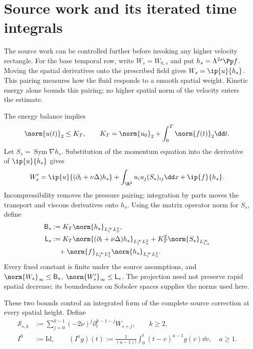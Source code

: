 \section{Source work and its iterated time integrals}
\label{r:sec:source-primitives}

The source work can be controlled further before invoking any higher
velocity rectangle. For the base temporal row, write \(W_s=W_{0,s}\)
and put \(h_s=\Lambda^{2s}\Pp f\). Moving the spatial derivatives onto
the prescribed field gives \(W_s=\ip{u}{h_s}\). This pairing measures
how the fluid responds to a smooth spatial weight. Kinetic energy alone bounds this pairing; no higher spatial norm
of the velocity enters the estimate.

The energy balance implies
\[
 \norm{u(t)}_2\le K_T,
 \qquad K_T=\norm{u_0}_2+\int_0^T\norm{f(t)}_2\dd t.
\]
Let \(S_s=\operatorname{Sym}\nabla h_s\). Substitution of the
momentum equation into the derivative of \(\ip{u}{h_s}\) gives
\begin{equation}
 W_s'=\ip{u}{(\partial_t+\nu\Delta)h_s}
 +\int_{\R^3}u_i u_j(S_s)_{ij}\dd x+\ip{f}{h_s}.
 \label{r:eq:source-first}
\end{equation}
Incompressibility removes the pressure pairing; integration by parts
moves the transport and viscous derivatives onto \(h_s\).
Using the matrix operator norm for \(S_s\), define
\begin{equation}
 \begin{aligned}
 \mathsf B_s&:=K_T\norm{h_s}_{L^\infty_tL^2_x},\\
 \mathsf L_s&:=K_T\norm{(\partial_t+\nu\Delta)h_s}_{L^\infty_tL^2_x}
 +K_T^2\norm{S_s}_{L^\infty_{t,x}}\\
 &\quad+\norm{f}_{L^\infty_tL^2_x}\norm{h_s}_{L^\infty_tL^2_x}.
 \end{aligned}
 \label{r:eq:source-work-constants}
\end{equation}
Every fixed constant is finite under the source assumptions, and
\(\norm{W_s}_\infty\le\mathsf B_s\),
\(\norm{W_s'}_\infty\le\mathsf L_s\). The projection need not preserve
rapid spatial decrease; its boundedness on Sobolev spaces supplies the
norms used here.

These two bounds control an integrated form of the complete source
correction at every spatial height. Define
\begin{equation}
 \begin{aligned}
 \mathcal S_{s,k}&:=\sum_{j=0}^{k-1}(-2\nu)^j
 \partial_t^{k-1-j}W_{s+j},\qquad k\ge2,\\
 I^0&:=\mathrm{Id},\qquad
 (I^a g)(t):=\frac1{(a-1)!}\int_0^t(t-v)^{a-1}g(v)\dd v,
 \quad a\ge1.
 \end{aligned}
 \label{r:eq:source-primitive-def}
\end{equation}


